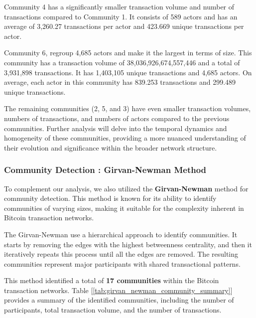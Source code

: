 \documentclass[a4paper, 12pt]{article}
\begin{document}
Community 4 has a significantly smaller transaction volume and number of transactions compared to Community 1. It consists of 589 actors and has an average of 3,260.27 transactions per actor and 423.669 unique transactions per actor.

Community 6, regroup 4,685 actors and make it the largest in terms of size. This community has a transaction volume of 38,036,926,674,557,446 and a total of 3,931,898 transactions. 
It has 1,403,105 unique transactions and 4,685 actors. On average, each actor in this community has 839.253 transactions and 299.489 unique transactions.

The remaining communities (2, 5, and 3) have even smaller transaction volumes, numbers of transactions, and numbers of actors compared to the previous communities.
Further analysis will delve into the temporal dynamics and homogeneity of these communities, providing a more nuanced understanding of their evolution and significance within the broader network structure.


\subsubsection{Community Detection : Girvan-Newman Method}
To complement our analysis, we also utilized the \textbf{Girvan-Newman} method for community detection. 
This method is known for its ability to identify communities of varying sizes, making it suitable for the complexity inherent in Bitcoin transaction networks.

The Girvan-Newman use a hierarchical approach to identify communities. It starts by removing the edges with the highest betweenness centrality, and then it iteratively repeats this process until all the edges are removed. The resulting communities represent major participants with shared transactional patterns.

This method identified a total of \textbf{17 communities} within the Bitcoin transaction networks. Table [\ref{tab:girvan_newman_community_summary}] provides a summary of the identified communities, including the number of participants, total transaction volume, and the number of transactions.
\end{document}
